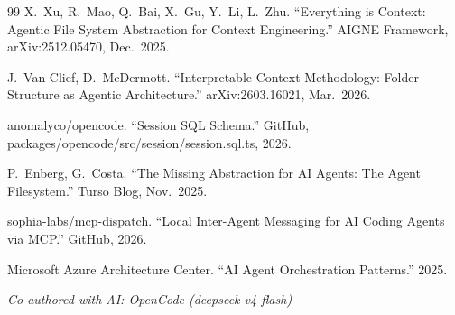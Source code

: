 \documentclass[11pt,a4paper]{article}
\begin{document}
\begin{thebibliography}{99}
X.\ Xu, R.\ Mao, Q.\ Bai, X.\ Gu, Y.\ Li, L.\ Zhu.
``Everything is Context: Agentic File System Abstraction for Context Engineering.''
AIGNE Framework, arXiv:2512.05470, Dec.\ 2025.

J.\ Van Clief, D.\ McDermott.
``Interpretable Context Methodology: Folder Structure as Agentic Architecture.''
arXiv:2603.16021, Mar.\ 2026.

anomalyco/opencode.
``Session SQL Schema.''
GitHub, packages/opencode/src/session/session.sql.ts, 2026.

P.\ Enberg, G.\ Costa.
``The Missing Abstraction for AI Agents: The Agent Filesystem.''
Turso Blog, Nov.\ 2025.

sophia-labs/mcp-dispatch.
``Local Inter-Agent Messaging for AI Coding Agents via MCP.''
GitHub, 2026.

Microsoft Azure Architecture Center.
``AI Agent Orchestration Patterns.''
2025.

\end{thebibliography}

\vspace{0.5cm}
\noindent\textit{Co-authored with AI: OpenCode (deepseek-v4-flash)}
\end{document}
